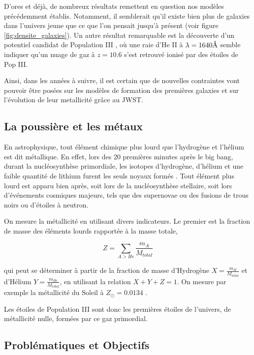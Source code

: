 \documentclass[11pt, a4paper]{article}
\begin{document}
D'ores et déjà, de nombreux résultats remettent en question nos modèles précédemment établis. Notamment, il semblerait qu'il existe bien plus de galaxies dans l'univers jeune que ce que l'on pensait jusqu'à présent \parencite{2023arXiv231104279F} (voir figure \ref{fig:densite_galaxies}). Un autre résultat remarquable est la découverte d'un potentiel candidat de Population III \parencite{2023arXiv230600953M}, où une raie d'He II à $\lambda = 1640 \text{\r{A}}$ semble indiquer qu'un nuage de gaz à $z = 10.6$ s'est retrouvé ionisé par des étoiles de Pop III. 

Ainsi, dans les années à suivre, il est certain que de nouvelles contraintes vont pouvoir être posées sur les modèles de formation des premières galaxies et sur l'évolution de leur metallicité grâce au JWST.

\subsection{La poussière et les métaux}

En astrophysique, tout élément chimique plus lourd que l'hydrogène et l'hélium est dit métallique. En effet, lors des 20 premières minutes après le big bang, durant la nucléosynthèse primordiale, les isotopes d'hydrogène, d'hélium et une faible quantité de lithium furent les seuls noyaux formés \parencite{2017IJMPE..2641002C}. Tout élément plus lourd est apparu bien après, soit lors de la nucléosynthèse stellaire, soit lors d'événements cosmiques majeurs, tels que des supernovae ou des fusions de trous noirs ou d'étoiles à neutron.

On mesure la métallicité en utilisant divers indicateurs. Le premier est la fraction de masse des éléments lourds rapportée à la masse totale,

\begin{equation}
  Z = \sum_{A > He} \frac{m_A}{M_{total}}
\end{equation}

qui peut se déterminer à partir de la fraction de masse d'Hydrogène $X = \frac{m_H}{M_{total}}$ et d'Hélium $Y = \frac{m_{He}}{M_{total}}$, en utilisant la relation $X + Y + Z = 1$. On mesure par exemple la métallicité du Soleil à $Z_\odot = 0.0134$ \parencite{2009ARA&A..47..481A}.



Les étoiles de Population III sont donc les premières étoiles de l'univers, de métallicité nulle, formées par ce gaz primordial.

\subsection{Problématiques et Objectifs}
\end{document}
